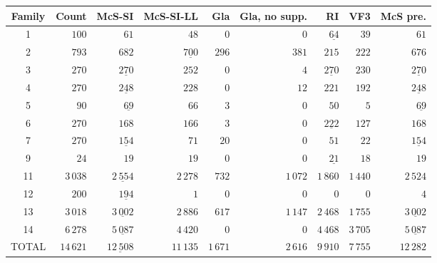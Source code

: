 
\begin{tabular}{crrrrrrrr}
    \toprule
    Family & Count & McS-SI & McS-SI-LL & Gla & Gla, no supp. & RI & VF3 & McS pre.\\
    \midrule

1 & $100$ & $61$ & $48$ & $0$ & $0$ & $\underline{64}$ & $39$ & $61$\\
2 & $793$ & $682$ & $\underline{700}$ & $296$ & $381$ & $215$ & $222$ & $676$\\
3 & $270$ & $\underline{270}$ & $252$ & $0$ & $4$ & $\underline{270}$ & $230$ & $\underline{270}$\\
4 & $270$ & $\underline{248}$ & $228$ & $0$ & $12$ & $221$ & $192$ & $\underline{248}$\\
5 & $90$ & $\underline{69}$ & $66$ & $3$ & $0$ & $50$ & $5$ & $\underline{69}$\\
6 & $270$ & $168$ & $166$ & $3$ & $0$ & $\underline{222}$ & $127$ & $168$\\
7 & $270$ & $\underline{154}$ & $71$ & $20$ & $0$ & $51$ & $22$ & $\underline{154}$\\
9 & $24$ & $19$ & $19$ & $0$ & $0$ & $\underline{21}$ & $18$ & $19$\\
11 & $3\,038$ & $\underline{2\,554}$ & $2\,278$ & $732$ & $1\,072$ & $1\,860$ & $1\,440$ & $2\,524$\\
12 & $200$ & $\underline{194}$ & $1$ & $0$ & $0$ & $0$ & $0$ & $4$\\
13 & $3\,018$ & $\underline{3\,002}$ & $2\,886$ & $617$ & $1\,147$ & $2\,468$ & $1\,755$ & $\underline{3\,002}$\\
14 & $6\,278$ & $\underline{5\,087}$ & $4\,420$ & $0$ & $0$ & $4\,468$ & $3\,705$ & $\underline{5\,087}$\\
TOTAL & $14\,621$ & $\underline{12\,508}$ & $11\,135$ & $1\,671$ & $2\,616$ & $9\,910$ & $7\,755$ & $12\,282$\\

    \bottomrule
\end{tabular}

